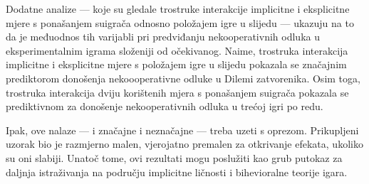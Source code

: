 \documentclass[a4paper, 12pt]{report}
\begin{document}
Dodatne analize --- koje su gledale trostruke
interakcije implicitne i eksplicitne mjere s ponašanjem suigrača odnosno
položajem igre u slijedu --- ukazuju na to da je međuodnos tih varijabli pri
predviđanju nekooperativnih odluka u eksperimentalnim igrama složeniji od
očekivanog. Naime, trostruka interakcija implicitne i eksplicitne mjere
s položajem igre u slijedu pokazala se značajnim prediktorom donošenja
nekoooperativne odluke u Dilemi zatvorenika. Osim toga, trostruka interakcija
dviju korištenih mjera s ponašanjem suigrača pokazala se prediktivnom za
donošenje nekooperativnih odluka u trećoj igri po redu. 

Ipak, ove nalaze --- i značajne i neznačajne --- treba uzeti s oprezom.
Prikupljeni uzorak bio je razmjerno malen, vjerojatno premalen za otkrivanje
efekata, ukoliko su oni slabiji. Unatoč tome, ovi rezultati mogu poslužiti kao
grub putokaz za daljnja istraživanja na području implicitne ličnosti i
bihevioralne teorije igara.
\end{document}
